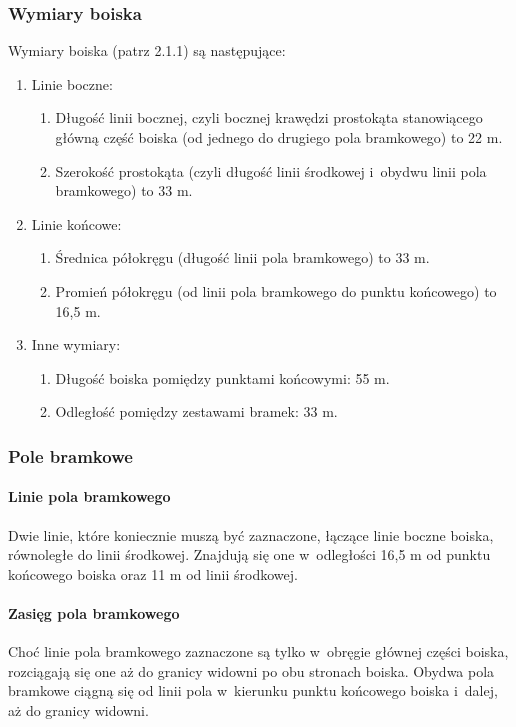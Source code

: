 \documentclass[12pt]{article}
\begin{document}
\subsubsection{Wymiary boiska}
Wymiary boiska (patrz 2.1.1) są następujące:
\begin{enumerate}
	\item{Linie boczne:}
	      \begin{enumerate}
		      \item Długość linii bocznej, czyli bocznej krawędzi prostokąta stanowiącego
		            główną część boiska (od jednego do drugiego pola bramkowego) to 22 m.

		      \item Szerokość prostokąta (czyli długość linii środkowej i~obydwu linii
		            pola bramkowego) to 33 m.
	      \end{enumerate}
	\item{Linie końcowe:}
	      \begin{enumerate}
		      \item Średnica półokręgu (długość linii pola bramkowego) to 33 m.

		      \item Promień półokręgu (od linii pola bramkowego do punktu końcowego) to
		            16,5 m.
	      \end{enumerate}
	\item{Inne wymiary:}
	      \begin{enumerate}
		      \item Długość boiska pomiędzy punktami końcowymi: 55 m.

		      \item Odległość pomiędzy zestawami bramek: 33 m.
	      \end{enumerate}
\end{enumerate}

\subsubsection{Pole bramkowe}
\paragraph{Linie pola bramkowego}
Dwie linie, które koniecznie
muszą być zaznaczone, łączące linie boczne boiska, równoległe do linii
środkowej. Znajdują się one w~odległości 16,5 m od punktu końcowego
boiska oraz 11 m od linii środkowej.

\paragraph{Zasięg pola bramkowego}
Choć linie pola bramkowego
zaznaczone są tylko w~obręgie głównej części boiska, rozciągają się one
aż do granicy widowni po obu stronach boiska. Obydwa pola bramkowe
ciągną się od linii pola w~kierunku punktu końcowego boiska i~dalej, aż
do granicy widowni.
\end{document}
